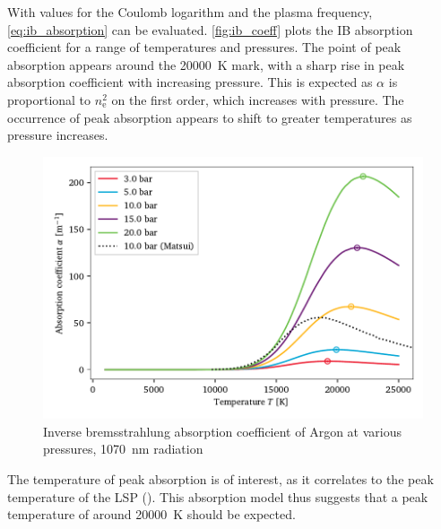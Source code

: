         With values for the Coulomb logarithm and the plasma frequency, \autoref{eq:ib_absorption} can be evaluated. \autoref{fig:ib_coeff} plots the IB absorption coefficient for a range of temperatures and pressures. The point of peak absorption appears around the \qty{20000}{K} mark, with a sharp rise in peak absorption coefficient with increasing pressure. This is expected as $\alpha$ is proportional to $n_\mathrm{e}^2$ on the first order, which increases with pressure. The occurrence of peak absorption appears to shift to greater temperatures as pressure increases.

        \begin{figure}[h]
            \centering
            \includegraphics[]{assets/4 models/absorption}
            \caption{Inverse bremsstrahlung absorption coefficient of Argon at various pressures, \qty{1070}{nm} radiation}
            \label{fig:ib_coeff}
        \end{figure}

        The temperature of peak absorption is of interest, as it correlates to the peak temperature of the LSP (\textcite{keeferLaserSustainedPlasmas1989}). This absorption model thus suggests that a peak temperature of around \qty{20000}{K} should be expected.